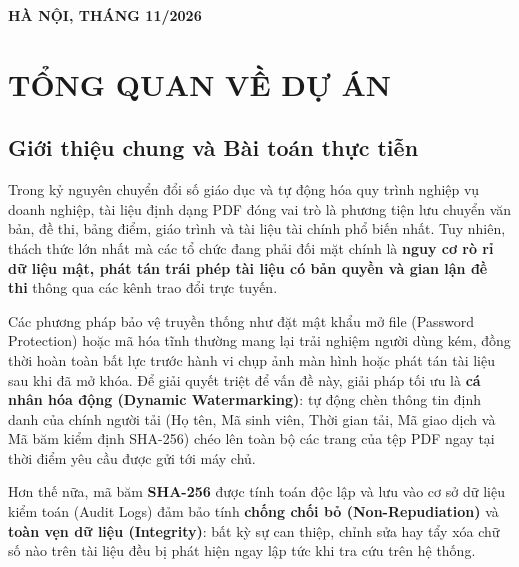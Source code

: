 \documentclass[12pt,a4paper]{report}
\begin{document}
\begin{titlepage}
\begin{center}
    \vfill
    {\textbf{HÀ NỘI, THÁNG 11/2026}}
\end{center}
\end{titlepage}

\tableofcontents
\newpage

\chapter{TỔNG QUAN VỀ DỰ ÁN}

\section{Giới thiệu chung và Bài toán thực tiễn}
Trong kỷ nguyên chuyển đổi số giáo dục và tự động hóa quy trình nghiệp vụ doanh nghiệp, tài liệu định dạng PDF đóng vai trò là phương tiện lưu chuyển văn bản, đề thi, bảng điểm, giáo trình và tài liệu tài chính phổ biến nhất. Tuy nhiên, thách thức lớn nhất mà các tổ chức đang phải đối mặt chính là \textbf{nguy cơ rò rỉ dữ liệu mật, phát tán trái phép tài liệu có bản quyền và gian lận đề thi} thông qua các kênh trao đổi trực tuyến.

Các phương pháp bảo vệ truyền thống như đặt mật khẩu mở file (Password Protection) hoặc mã hóa tĩnh thường mang lại trải nghiệm người dùng kém, đồng thời hoàn toàn bất lực trước hành vi chụp ảnh màn hình hoặc phát tán tài liệu sau khi đã mở khóa. Để giải quyết triệt để vấn đề này, giải pháp tối ưu là \textbf{cá nhân hóa động (Dynamic Watermarking)}: tự động chèn thông tin định danh của chính người tải (Họ tên, Mã sinh viên, Thời gian tải, Mã giao dịch và Mã băm kiểm định SHA-256) chéo lên toàn bộ các trang của tệp PDF ngay tại thời điểm yêu cầu được gửi tới máy chủ.

Hơn thế nữa, mã băm \textbf{SHA-256} được tính toán độc lập và lưu vào cơ sở dữ liệu kiểm toán (Audit Logs) đảm bảo tính \textbf{chống chối bỏ (Non-Repudiation)} và \textbf{toàn vẹn dữ liệu (Integrity)}: bất kỳ sự can thiệp, chỉnh sửa hay tẩy xóa chữ số nào trên tài liệu đều bị phát hiện ngay lập tức khi tra cứu trên hệ thống.
\end{document}
